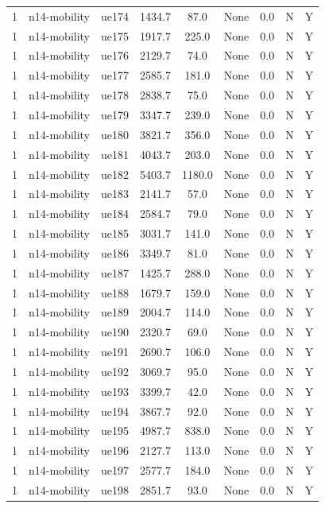 \begin{table}[ht]
\begin{tabular}{|c|c|c|c|c|c|c|c|c|}
1 & n14-mobility & ue174 & 1434.7 & 87.0 & None & 0.0 & N & Y \\
1 & n14-mobility & ue175 & 1917.7 & 225.0 & None & 0.0 & N & Y \\
1 & n14-mobility & ue176 & 2129.7 & 74.0 & None & 0.0 & N & Y \\
1 & n14-mobility & ue177 & 2585.7 & 181.0 & None & 0.0 & N & Y \\
1 & n14-mobility & ue178 & 2838.7 & 75.0 & None & 0.0 & N & Y \\
1 & n14-mobility & ue179 & 3347.7 & 239.0 & None & 0.0 & N & Y \\
1 & n14-mobility & ue180 & 3821.7 & 356.0 & None & 0.0 & N & Y \\
1 & n14-mobility & ue181 & 4043.7 & 203.0 & None & 0.0 & N & Y \\
1 & n14-mobility & ue182 & 5403.7 & 1180.0 & None & 0.0 & N & Y \\
1 & n14-mobility & ue183 & 2141.7 & 57.0 & None & 0.0 & N & Y \\
1 & n14-mobility & ue184 & 2584.7 & 79.0 & None & 0.0 & N & Y \\
1 & n14-mobility & ue185 & 3031.7 & 141.0 & None & 0.0 & N & Y \\
1 & n14-mobility & ue186 & 3349.7 & 81.0 & None & 0.0 & N & Y \\
1 & n14-mobility & ue187 & 1425.7 & 288.0 & None & 0.0 & N & Y \\
1 & n14-mobility & ue188 & 1679.7 & 159.0 & None & 0.0 & N & Y \\
1 & n14-mobility & ue189 & 2004.7 & 114.0 & None & 0.0 & N & Y \\
1 & n14-mobility & ue190 & 2320.7 & 69.0 & None & 0.0 & N & Y \\
1 & n14-mobility & ue191 & 2690.7 & 106.0 & None & 0.0 & N & Y \\
1 & n14-mobility & ue192 & 3069.7 & 95.0 & None & 0.0 & N & Y \\
1 & n14-mobility & ue193 & 3399.7 & 42.0 & None & 0.0 & N & Y \\
1 & n14-mobility & ue194 & 3867.7 & 92.0 & None & 0.0 & N & Y \\
1 & n14-mobility & ue195 & 4987.7 & 838.0 & None & 0.0 & N & Y \\
1 & n14-mobility & ue196 & 2127.7 & 113.0 & None & 0.0 & N & Y \\
1 & n14-mobility & ue197 & 2577.7 & 184.0 & None & 0.0 & N & Y \\
1 & n14-mobility & ue198 & 2851.7 & 93.0 & None & 0.0 & N & Y \\

\end{tabular}
\end{table}
